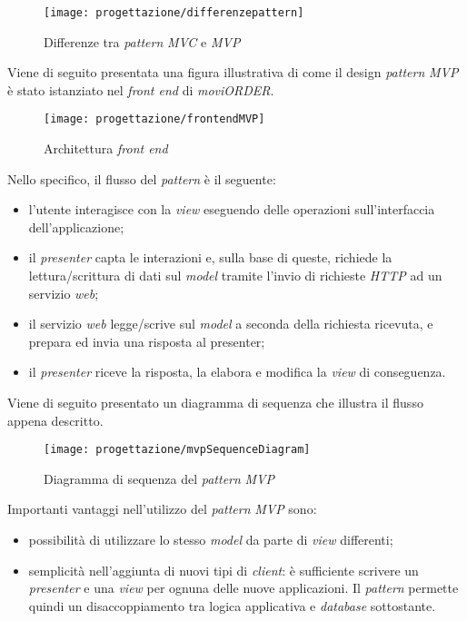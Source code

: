 \begin{figure}[!h] 
    \centering 
    \texttt{[image: progettazione/differenzepattern]} 
    \caption{Differenze tra \textit{pattern} \textit{MVC} e \textit{MVP}}
\end{figure}

Viene di seguito presentata una figura illustrativa di come il design \textit{pattern} \textit{MVP} è stato istanziato nel \textit{front end} di \textit{moviORDER}.

\begin{figure}[!h] 
    \centering 
    \texttt{[image: progettazione/frontendMVP]} 
    \caption{Architettura \textit{front end}}
\end{figure}

Nello specifico, il flusso del \textit{pattern} è il seguente:
\begin{itemize}
	\item l'utente interagisce con la \textit{view} eseguendo delle operazioni sull'interfaccia dell'applicazione;
	\item il \textit{presenter} capta le interazioni e, sulla base di queste, richiede la lettura/scrittura di dati sul \textit{model} tramite l'invio di richieste \textit{HTTP} ad un servizio \textit{web};
	\item il servizio \textit{web} legge/scrive sul \textit{model} a seconda della richiesta ricevuta, e prepara ed invia una risposta al presenter;
	\item il \textit{presenter} riceve la risposta, la elabora e modifica la \textit{view} di conseguenza.
\end{itemize}
Viene di seguito presentato un diagramma di sequenza che illustra il flusso appena descritto.

\begin{figure}[!h] 
    \centering 
    \texttt{[image: progettazione/mvpSequenceDiagram]} 
    \caption{Diagramma di sequenza del \textit{pattern} \textit{MVP}}
\end{figure}

Importanti vantaggi nell'utilizzo del \textit{pattern} \textit{MVP} sono:
\begin{itemize}
	\item possibilità di utilizzare lo stesso \textit{model} da parte di \textit{view} differenti;
	\item semplicità nell'aggiunta di nuovi tipi di \textit{client}: è sufficiente scrivere un \textit{presenter} e una \textit{view} per ognuna delle nuove applicazioni. Il \textit{pattern} permette quindi un disaccoppiamento tra logica applicativa e \textit{database} sottostante.
\end{itemize}

